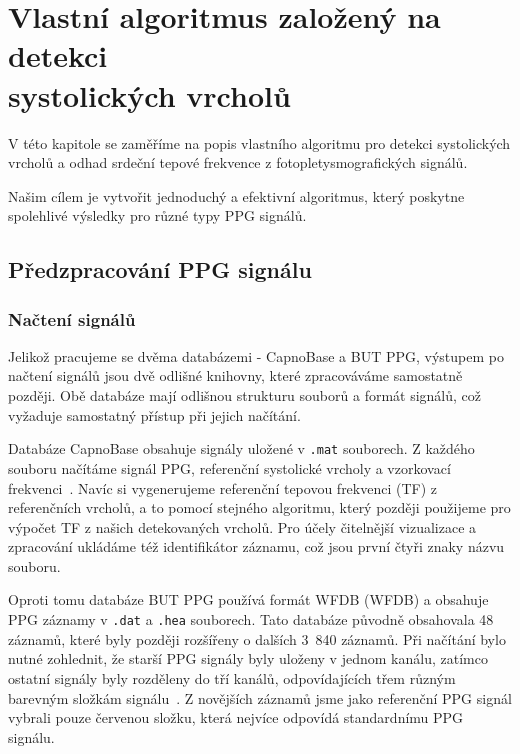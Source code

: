 \chapter[Vlastní algoritmus založený na detekci systolických vrcholů]{Vlastní algoritmus založený na detekci \\systolických vrcholů}
\label{ch:VlastniAlg}
V této kapitole se zaměříme na popis vlastního algoritmu pro detekci systolických vrcholů a odhad srdeční tepové frekvence z fotopletysmografických signálů.

Našim cílem je vytvořit jednoduchý a efektivní algoritmus, který poskytne spolehlivé výsledky pro různé typy PPG signálů.

\section{Předzpracování PPG signálu}
\label{sec:alg_preproc}

\subsection*{Načtení signálů}
\label{sec:alg_load}
Jelikož pracujeme se dvěma databázemi - CapnoBase a \acs{BUT PPG}, výstupem po načtení signálů jsou dvě odlišné knihovny, které zpracováváme samostatně později.
Obě databáze mají odlišnou strukturu souborů a formát signálů, což vyžaduje samostatný přístup při jejich načítání.

Databáze CapnoBase obsahuje signály uložené v \texttt{.mat} souborech.
Z každého souboru načítáme signál \acs{PPG}, referenční systolické vrcholy a vzorkovací frekvenci~\cite{CapnoBase}.
Navíc si vygenerujeme referenční tepovou frekvenci (TF) z referenčních vrcholů, a to pomocí stejného algoritmu, který později použijeme pro výpočet TF z našich detekovaných vrcholů.
Pro účely čitelnější vizualizace a zpracování ukládáme též identifikátor záznamu, což jsou první čtyři znaky názvu souboru.

Oproti tomu databáze \acs{BUT PPG} používá formát \acl{WFDB} (\acs{WFDB}) a obsahuje \acs{PPG} záznamy v \texttt{.dat} a \texttt{.hea} souborech.
Tato databáze původně obsahovala 48 záznamů, které byly později rozšířeny o dalších 3~840 záznamů.
Při načítání bylo nutné zohlednit, že starší \acs{PPG} signály byly uloženy v jednom kanálu, zatímco ostatní signály byly rozděleny do tří kanálů, odpovídajících třem různým barevným složkám signálu~\cite{BUT_PPG_database}.
Z novějších záznamů jsme jako referenční \acs{PPG} signál vybrali pouze červenou složku, která nejvíce odpovídá standardnímu \acs{PPG} signálu.

